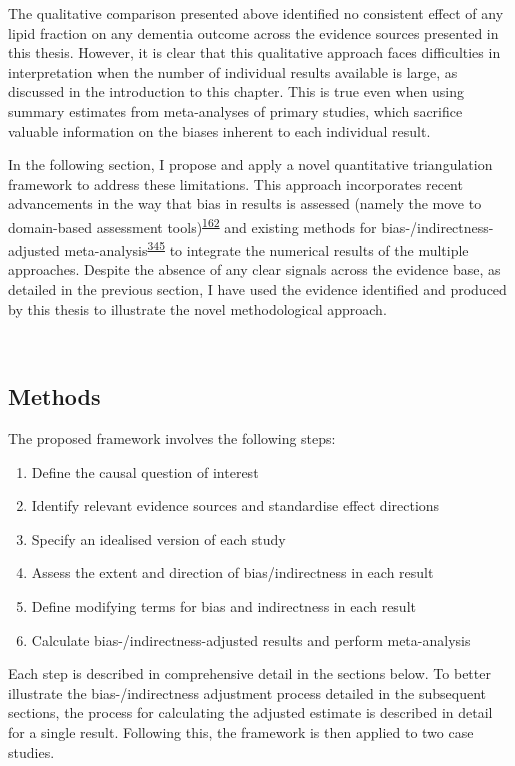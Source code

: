 \documentclass[a4paper, twoside]{templates/ociamthesis}
\providecommand{\tightlist}{%
  \setlength{\itemsep}{0pt}\setlength{\parskip}{0pt}}
\begin{document}
The qualitative comparison presented above identified no consistent effect of any lipid fraction on any dementia outcome across the evidence sources presented in this thesis. However, it is clear that this qualitative approach faces difficulties in interpretation when the number of individual results available is large, as discussed in the introduction to this chapter. This is true even when using summary estimates from meta-analyses of primary studies, which sacrifice valuable information on the biases inherent to each individual result.

In the following section, I propose and apply a novel quantitative triangulation framework to address these limitations. This approach incorporates recent advancements in the way that bias in results is assessed (namely the move to domain-based assessment tools)\textsuperscript{\protect\hyperlink{ref-sterne2019}{162}} and existing methods for bias-/indirectness-adjusted meta-analysis\textsuperscript{\protect\hyperlink{ref-turner2009}{345}} to integrate the numerical results of the multiple approaches. Despite the absence of any clear signals across the evidence base, as detailed in the previous section, I have used the evidence identified and produced by this thesis to illustrate the novel methodological approach.

~

\hypertarget{methods-3}{%
\subsection{Methods}\label{methods-3}}

The proposed framework involves the following steps:

\begin{enumerate}
\def\labelenumi{\arabic{enumi}.}
\tightlist
\item
  Define the causal question of interest
\item
  Identify relevant evidence sources and standardise effect directions
\item
  Specify an idealised version of each study
\item
  Assess the extent and direction of bias/indirectness in each result
\item
  Define modifying terms for bias and indirectness in each result
\item
  Calculate bias-/indirectness-adjusted results and perform meta-analysis
\end{enumerate}

Each step is described in comprehensive detail in the sections below. To better illustrate the bias-/indirectness adjustment process detailed in the subsequent sections, the process for calculating the adjusted estimate is described in detail for a single result. Following this, the framework is then applied to two case studies.
\end{document}
